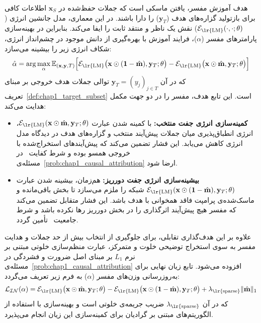 هدف آموزش مفسر، یافتن ماسکی است که جملات حفظ‌شده در $\mathbf{x}_S$ اطلاعات کافی برای بازتولید گزاره‌های هدف ($\mathbf{y}_T$) را دارا باشند. در این معماری، مدل جانشین انرژی ($\mathcal{E}_{\text{\lr{LM}}}(\cdot, \cdot; \theta)$) نقش یک ناظر و منتقد ثابت را ایفا می‌کند. بنابراین در بهینه‌سازی پارامترهای مفسر ($\alpha$)، فرایند آموزش با بهره‌گیری از دانش موجود در چشم‌انداز انرژی، شکاف انرژی زیر را بیشینه می‌سازد:
\begin{equation}\label{eq:chap4_interpreter_objective}
    \hat{\alpha} = \arg\max_\alpha \mathbb{E}_{(\mathbf{x}, \mathbf{y}, T)} \Big[ \mathcal{E}_{\text{\lr{LM}}}\big(\mathbf{x} \odot (\mathbf{1} - \hat{\mathbf{m}}), \mathbf{y}_T; \theta\big) - \mathcal{E}_{\text{\lr{LM}}}\big(\mathbf{x} \odot \hat{\mathbf{m}}, \mathbf{y}_T; \theta\big) \Big]
\end{equation}
که در آن $\mathbf{y}_T = {(y_j)}_{j \in T}$ توالی جملات هدف خروجی بر مبنای تعریف~\ref{def:chap1_target_subset} است. این تابع هدف، مفسر را در دو جهت مکمل هدایت می‌کند:
\begin{itemize}
    \item \textbf{کمینه‌سازی انرژی جفت منتخب:} با کمینه شدن عبارت $\mathcal{E}_{\text{\lr{LM}}}(\mathbf{x} \odot \hat{\mathbf{m}}, \mathbf{y}_T; \theta)$، انرژی انطباق‌پذیری میان جملات پیش‌آیند منتخب و گزاره‌های هدف در دیدگاه مدل انرژی کاهش می‌یابد. این فشار تضمین می‌کند که پیش‌آیندهای استخراج‌شده با خروجی همسو بوده و شرط کفایت~\cite{deyoung2020eraser} در مسئله‌ی~\ref{prob:chap1_causal_attribution} ارضا شود.
    \item \textbf{بیشینه‌سازی انرژی جفت دورریز:} هم‌زمان، بیشینه شدن عبارت $\mathcal{E}_{\text{\lr{LM}}}(\mathbf{x} \odot (\mathbf{1} - \hat{\mathbf{m}}), \mathbf{y}_T; \theta)$ شبکه را ملزم می‌سازد تا بخش باقی‌مانده و ماسک‌شده‌ی پرامپت فاقد همخوانی با هدف باشد. این فشار متقابل تضمین می‌کند که مفسر هیچ پیش‌آیند اثرگذاری را در بخش دورریز رها نکرده باشد و شرط جامعیت~\cite{deyoung2020eraser} تأمین گردد.
\end{itemize}

علاوه بر این هدف‌گذاری تقابلی، برای جلوگیری از انتخاب بیش از حد جملات و هدایت مفسر به سوی استخراج توضیحی خلوت و متمرکز، عبارت منظم‌سازی خلوتی مبتنی بر نرم $L_1$ بر مبنای اصل ضرورت و فشردگی در مسئله‌ی~\ref{prob:chap1_causal_attribution} افزوده می‌شود. تابع زیان نهایی برای به‌روزرسانی وزن‌های مفسر ($\alpha$) به فرم زیر تعریف می‌گردد:
\begin{equation}\label{eq:chap4_interpreter_loss_final}
    \mathcal{L}_{\mathcal{IN}}(\alpha) = \mathcal{E}_{\text{\lr{LM}}}\big(\mathbf{x} \odot \hat{\mathbf{m}}, \mathbf{y}_T; \theta\big) - \mathcal{E}_{\text{\lr{LM}}}\big(\mathbf{x} \odot (\mathbf{1} - \hat{\mathbf{m}}), \mathbf{y}_T; \theta\big) + \lambda_{\text{\lr{sparse}}} \|\hat{\mathbf{m}}\|_1
\end{equation}
که در آن $\lambda_{\text{\lr{sparse}}}$ ضریب جریمه‌ی خلوتی است و بهینه‌سازی با استفاده از الگوریتم‌های مبتنی بر گرادیان برای کمینه‌سازی این زیان انجام می‌پذیرد.

